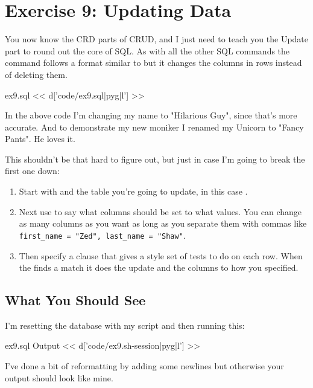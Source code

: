 \chapter{Exercise 9: Updating Data}

You now know the CRD parts of CRUD, and I just need to teach you the Update
part to round out the core of SQL.  As with all the other SQL commands
the  command follows a format similar to  but
it changes the columns in rows instead of deleting them.

\begin{code}{ex9.sql}
<< d['code/ex9.sql|pyg|l'] >>
\end{code}

In the above code I'm changing my name to "Hilarious Guy", since that's
more accurate.  And to demonstrate my new moniker I renamed my Unicorn
to "Fancy Pants".  He loves it.

This shouldn't be that hard to figure out, but just in case I'm going to
break the first one down:

\begin{enumerate}
\item Start with  and the table you're going to update, in this
    case .
\item Next use  to say what columns should be set to what values.
    You can change as many columns as you want as long as you separate them
    with commas like \verb|first_name = "Zed", last_name = "Shaw"|.
\item Then specify a  clause that gives a  style
    set of tests to do on each row.  When the  finds a match it
    does the update and  the columns to how you specified.
\end{enumerate}

\section{What You Should See}

I'm resetting the database with my  script and then running
this:

\begin{code}{ex9.sql Output}
<< d['code/ex9.sh-session|pyg|l'] >>
\end{code}

I've done a bit of reformatting by adding some newlines but otherwise
your output should look like mine.

